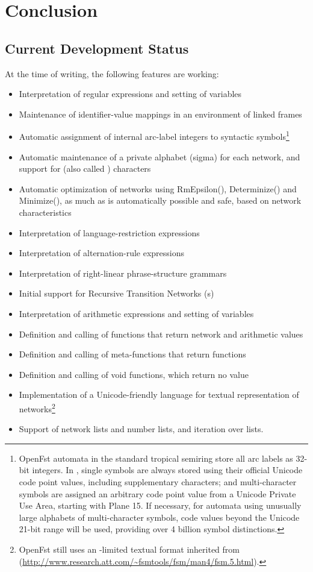\chapter{Conclusion}

\section{Current Development Status}

At the time of writing, the following \Kleene{} features are working:

\begin{itemize}
\item
Interpretation of regular expressions and setting of variables
\item
Maintenance of identifier-value mappings in an environment of linked frames
\item
Automatic assignment of internal arc-label integers to syntactic
symbols\footnote{OpenFst automata in the standard tropical
semiring
store all arc labels as 32-bit integers.  In \Kleene{}, single symbols are always stored using their
official Unicode code point values, including supplementary characters; and
multi-character symbols are assigned an arbitrary code point value from
a Unicode Private Use Area, starting with Plane 15.  If necessary, for
automata using unusually
large alphabets of multi-character symbols, code values beyond the Unicode
21-bit range will be used, providing over 4 billion symbol distinctions.}
\item
Automatic maintenance of a private alphabet (sigma) for each network, and support
for  (also called ) characters
\item
Automatic optimization of networks using RmEpsilon(), Determinize() and Minimize(), as much
as is automatically possible and safe, based on network characteristics
\item
Interpretation of language-restriction expressions
\item
Interpretation of alternation-rule expressions
\item
Interpretation of right-linear phrase-structure grammars
\item
Initial support for Recursive Transition Networks (s)
\item
Interpretation of arithmetic expressions and setting of variables
\item
Definition and calling of functions that return network and arithmetic values
\item
Definition and calling of meta-functions that return functions
\item
Definition and calling of void functions, which return no value
\item
Implementation of a Unicode-friendly  language for textual representation of
networks\footnote{OpenFst still uses an -limited textual format inherited from
 (\url{http://www.research.att.com/~fsmtools/fsm/man4/fsm.5.html}).}
\item
Support of network lists and number lists, and iteration over lists.
\end{itemize}

